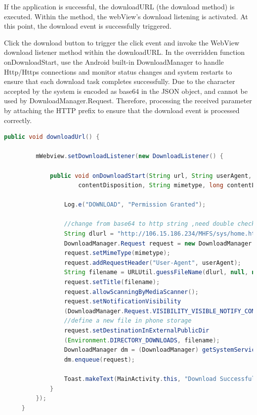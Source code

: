 \documentclass[a4paper,11pt]{article}
\begin{document}
\begin{itemize}
    \par If the application is successful, the downloadURL (the download method) is executed. Within the method, the webView's download listening is activated. At this point, the download event is successfully triggered.
    \par Click the download button to trigger the click event and invoke the WebView download listener method within the downloadURL. In the overridden function onDownloadStart, use the Android built-in DownloadManager  to handle Http/Https connections and monitor status changes and system restarts to ensure that each download task completes successfully. Due to the character accepted by the system is encoded as base64 in the JSON object, and cannot be used by DownloadManager.Request. Therefore, processing the received parameter by attaching the HTTP prefix to ensure that the download event is processed correctly.

    \begin{lstlisting}[language=Java]
    public void downloadUrl() {

         mWebview.setDownloadListener(new DownloadListener() {

             public void onDownloadStart(String url, String userAgent, String
                     contentDisposition, String mimetype, long contentLength) {

                 Log.e("DOWNLOAD", "Permission Granted");

                 //change from base64 to http string ,need double check with Fei& LJS
                 String dlurl = "http://106.15.186.234/MHFS/sys/home.html\n" + url;
                 DownloadManager.Request request = new DownloadManager.Request(Uri.parse(dlurl));
                 request.setMimeType(mimetype);
                 request.addRequestHeader("User-Agent", userAgent);
                 String filename = URLUtil.guessFileName(dlurl, null, null);
                 request.setTitle(filename);
                 request.allowScanningByMediaScanner();
                 request.setNotificationVisibility
                 (DownloadManager.Request.VISIBILITY_VISIBLE_NOTIFY_COMPLETED);
                 //define a new file in phone storage 
                 request.setDestinationInExternalPublicDir
                 (Environment.DIRECTORY_DOWNLOADS, filename);
                 DownloadManager dm = (DownloadManager) getSystemService(DOWNLOAD_SERVICE);
                 dm.enqueue(request);

                 Toast.makeText(MainActivity.this, "Download Successful", Toast.LENGTH_LONG).show();
             }
         });
     }
    \end{lstlisting}
\end{itemize}
\end{document}

